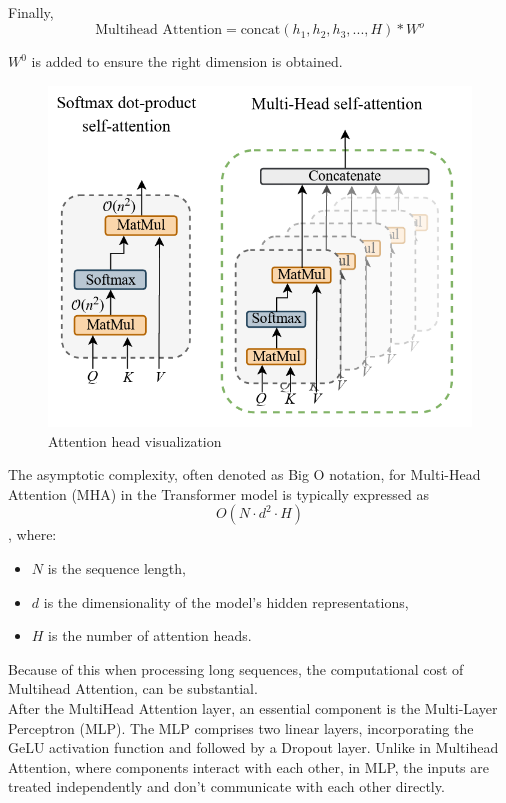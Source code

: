 Finally,
\begin{equation}
    \text{Multihead Attention} = \text{concat} (h_1, h_2, h_3,...,H)* W^o
\end{equation}

$W^0$ is added to ensure the right dimension is obtained.


\begin{figure}[htbp]
    \centering
    \includegraphics[width=5in]{img/Attentionfig.png}
    \caption{{Attention head visualization}}
\end{figure}

The asymptotic complexity, often denoted as Big O notation, for Multi-Head Attention (MHA) in the Transformer model is typically expressed as\[ O(N \cdot d^2 \cdot H)\], where:
\begin{itemize}
    \item $N$ is the sequence length,
    \item $d$ is the dimensionality of the model's hidden representations,
    \item $H$ is the number of attention heads.
\end{itemize}
Because of this when processing long sequences, the computational cost of Multihead Attention, can be substantial.\\

After the MultiHead Attention layer, an essential component is the Multi-Layer Perceptron (MLP). The MLP comprises two linear layers, incorporating the GeLU activation function and followed by a Dropout layer. Unlike in Multihead Attention, where components interact with each other, in MLP, the inputs are treated independently and don't communicate with each other directly.\\

